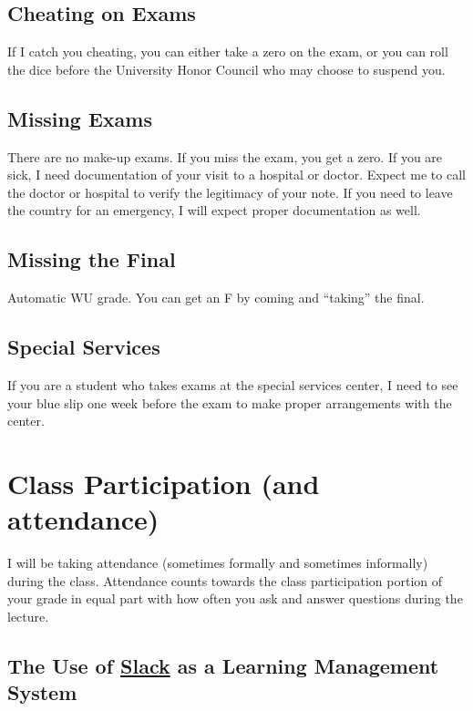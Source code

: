 \documentclass[12pt]{article}
\newcommand{\qu}[1]{``#1''}
\begin{document}
\subsection*{Cheating on Exams}

If I catch you cheating, you can either take a zero on the exam, or you can roll the dice before the University Honor Council who may choose to suspend you.


\subsection*{Missing Exams}

There are no make-up exams. If you miss the exam, you get a zero. If you are sick, I need documentation of your visit to a hospital or doctor. Expect me to call the doctor or hospital to verify the legitimacy of your note. If you need to leave the country for an emergency, I will expect proper documentation as well.


\subsection*{Missing the Final}

Automatic WU grade. You can get an F by coming and \qu{taking} the final.

\subsection*{Special Services}

If you are a student who takes exams at the special services center, I need to see your blue slip one week before the exam to make proper arrangements with the center.

\section*{Class Participation (and attendance)}

I will be taking attendance (sometimes formally and sometimes informally) during the class. Attendance counts towards the class participation portion of your grade in equal part with how often you ask and answer questions during the lecture.

\subsection*{The Use of \href{slack.com}{Slack} as a Learning Management System}
\end{document}
